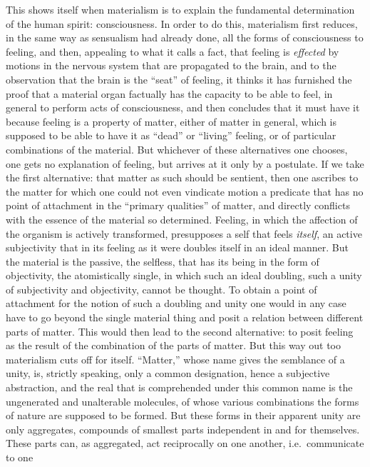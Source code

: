 This shows itself when materialism is to explain the fundamental
determination of the human spirit: consciousness. In order to do this,
materialism first reduces, in the same way as sensualism had already
done, all the forms of consciousness to feeling, and then, appealing to
what it calls a fact, that feeling is \emph{effected} by motions in the
nervous system that are propagated to the brain, and to the observation
that the brain is the ``seat'' of feeling, it thinks it has furnished
the proof that a material organ factually has the capacity to be able
to feel, in general to perform acts of consciousness, and then
concludes that it must have it because feeling is a property of
matter, either of matter in general, which is supposed to be able to
have it as ``dead'' or ``living'' feeling, or of particular
combinations of the material. But whichever of these alternatives one
chooses, one gets no explanation of feeling, but arrives at it only by
a postulate. If we take the first alternative: that matter as such
should be sentient, then one ascribes to the matter for which one could
not even vindicate motion a predicate that has no point of attachment
in the ``primary qualities'' of matter, and directly conflicts with the
essence of the material so determined. Feeling, in which the affection
of the organism is actively transformed, presupposes a self that feels
\emph{itself}, an active subjectivity that in its feeling as it were
doubles itself in an ideal manner. But the material is the passive,
the selfless, that has its being in the form of objectivity, the
atomistically single, in which such an ideal doubling, such a
unity of subjectivity and objectivity, cannot be thought. To obtain a
point of attachment for the notion of such a doubling and unity one
would in any case have to go beyond the single material thing and
posit a relation between different parts of matter. This would then
lead to the second alternative: to posit feeling as the result of the
combination of the parts of matter. But this way out too materialism
cuts off for itself. ``Matter,'' whose name gives the semblance of a
unity, is, strictly speaking, only a common designation, hence a
subjective abstraction, and the real that is comprehended under this
common name is the ungenerated and unalterable molecules, of whose
various combinations the forms of nature are supposed to be formed. But
these forms in their apparent unity are only aggregates, compounds of
smallest parts independent in and for themselves. These parts can, as
aggregated, act reciprocally on one another, i.e.\ communicate to one
